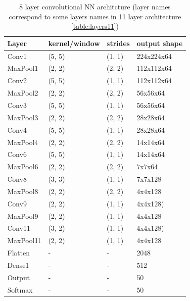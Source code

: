 \documentclass[a4paper]{article}
\begin{document}
\begin{table}[!hbt]
    \caption{ 8 layer convolutional NN architcture (layer names correspond to some layers names in 11 layer architecture \ref{table:layers11})
    \label{table:layers8}
    }
\begin{center}
    \begin{tabular}{| l | l | l | l |}
    \hline
        Layer & kernel/window& strides & output shape\\
    \hline
        Conv1  & (5, 5)&        (1, 1)&     224x224x64  \\
    \hline
        MaxPool1 & (2, 2)&      (2, 2)&     112x112x64  \\
        Conv2  & (5, 5)&        (1, 1)&     112x112x64  \\
    \hline
        MaxPool2 & (2, 2)&      (2, 2)&     56x56x64    \\
        Conv3  & (5, 5)&        (1, 1)&     56x56x64    \\
    \hline
        MaxPool3 & (2, 2)&      (2, 2)&     28x28x64    \\
        Conv4  & (5, 5)&        (1, 1)&     28x28x64  \\
    \hline
        MaxPool4 & (2, 2)&      (2, 2)&     14x14x64  \\
        Conv6  & (5, 5)&        (1, 1)&     14x14x64  \\
    \hline
        MaxPool6 & (2, 2)&      (2, 2)&     7x7x64  \\
        Conv8  & (3, 3)&        (1, 1)&     7x7x128\\
    \hline
        MaxPool8 & (2, 2)&      (2, 2)&     4x4x128  \\
        Conv9  & (2, 2)&        (1, 1)&     4x4x128)\\
    \hline
        MaxPool9 & (2, 2)&      (1, 1)&     4x4x128  \\
        Conv11 & (3, 2)&        (1, 1)&     4x4x128)\\  %
    \hline
        MaxPool11 & (2, 2)&      (1, 1)&     4x4x128  \\
        Flatten & - & - & 2048 \\
        Dense1 & - & - & 512 \\
    \hline
        Output & - & - & 50 \\
        Softmax & - & - & 50 \\
    \hline
    \end{tabular}
\end{center}
\end{table}
\end{document}
